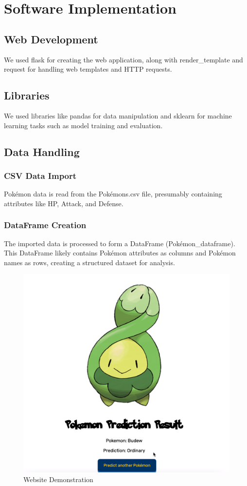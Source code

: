 \documentclass[conference]{IEEEtran}
\begin{document}
\section{Software Implementation}
\subsection{Web Development}
We used flask for creating the web application, along with render\_template and request for handling web templates and HTTP requests.
\subsection{Libraries}
We used libraries like pandas for data manipulation and sklearn for machine learning tasks such as model training and evaluation.

\subsection{Data Handling}
\subsubsection{CSV Data Import} Pokémon data is read from the Pokémons.csv file, presumably containing attributes like HP, Attack, and Defense.

\subsubsection{DataFrame Creation} The imported data is processed to form a DataFrame (Pokémon\_dataframe). This DataFrame likely contains Pokémon attributes as columns and Pokémon names as rows, creating a structured dataset for analysis.

\begin{figure}
  \centering
  \includegraphics[width=1\linewidth]{website_output.png}
  \caption{Website Demonstration}
  \label{fig:your_photo}
\end{figure}
\end{document}
